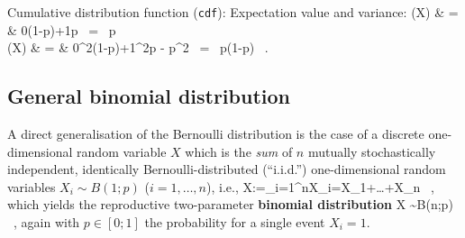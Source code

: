 \medskip
\noindent
Cumulative distribution function (\texttt{cdf}):
%
\be
{}
\ee
%
Expectation value and variance:
%
\bea
{}(X) & = & 0\times(1-p)+1\times p \ = \ p \\
(X) & = & 0^{2}\times(1-p)+1^{2}\times p - p^{2}
\ = \ p(1-p) \ .
\eea
%

\subsection[General binomial distribution]{General binomial
distribution}
A direct generalisation of the Bernoulli distribution is the 
case of a discrete one-dimensional random variable $X$ which is 
the \textit{sum} of $n$ mutually stochastically independent, 
identically Bernoulli-distributed (``i.i.d.'') one-dimensional 
random variables $X_{i}\sim B(1;p)$ ($i=1,\ldots,n$), i.e.,
%
\be
X:=\sum_{i=1}^{n}X_{i}=X_{1}+\ldots +X_{n} \ ,
\ee
%
which yields the reproductive two-parameter \textbf{binomial 
distribution}
%
\be
X \sim B(n;p) \ ,
\ee
%
again with $p \in [0;1]$ the probability for a single event 
$X_{i}=1$.

